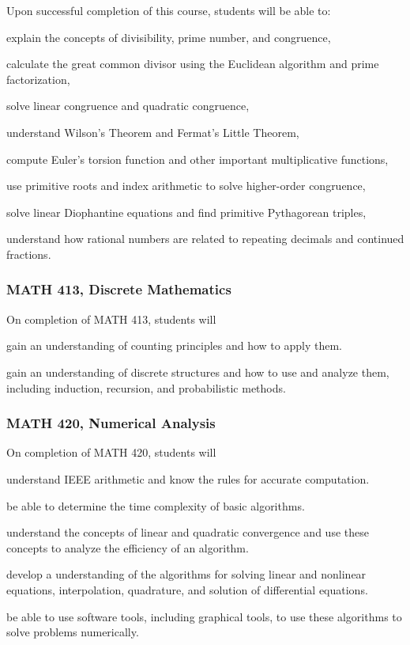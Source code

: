 
Upon successful completion of this course, students will be able to:
\begin{alphalist}
    \item explain the concepts of divisibility, prime number, and congruence, 
    \item calculate the great common divisor using the Euclidean algorithm and prime factorization, 
    \item solve linear congruence and quadratic congruence, 
    \item understand Wilson’s Theorem and Fermat’s Little Theorem, 
    \item compute Euler's torsion function and other important multiplicative functions,
    \item use primitive roots and index arithmetic to solve higher-order congruence,  
    \item solve linear Diophantine equations and find primitive Pythagorean triples,
    \item understand how rational numbers are related to repeating decimals and continued fractions.
\end{alphalist}

\subsubsection*{MATH 413, Discrete Mathematics}

On completion of MATH 413, students will 
\begin{alphalist}
    \item gain an understanding of counting principles and how to apply them.
    \item gain an understanding of discrete structures and how to use and analyze them, including induction, recursion, and probabilistic methods.
\end{alphalist}

\subsubsection*{MATH 420, Numerical Analysis}

On completion of MATH 420, students will
\begin{alphalist}
    \item understand IEEE arithmetic and know the rules for accurate computation.
    \item be able to determine the time complexity of basic algorithms.
    \item understand the concepts of linear and quadratic convergence and use these concepts to analyze the efficiency of an algorithm.
    \item develop a understanding of the algorithms for solving linear and nonlinear equations, interpolation, quadrature, and solution of differential equations.
    \item be able to use software tools, including graphical tools, to use these algorithms to solve problems numerically.
\end{alphalist}

